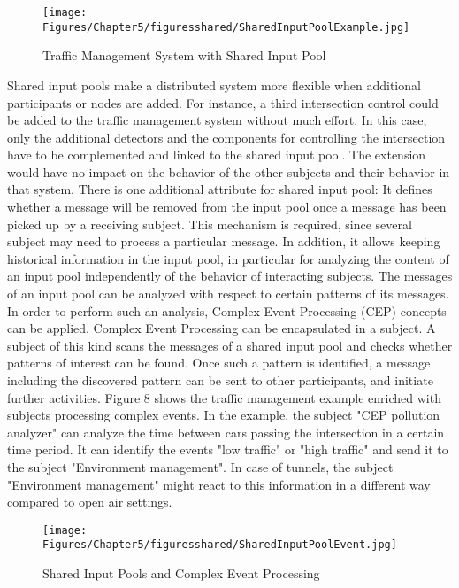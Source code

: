 \begin{figure}[htbp]
	\centering
	\texttt{[image: Figures/Chapter5/figuresshared/SharedInputPoolExample.jpg]}
	\caption[Traffic Management System with Shared Input Pool]{Traffic Management System with Shared Input Pool}
	\label{fig:SharedInputPooTraffic}
\end{figure}


Shared input pools make a distributed system more flexible when additional participants or nodes are added. For instance, a third intersection control could be added to the traffic management system without much effort. In this case, only the additional detectors and the components for controlling the intersection have to be complemented and linked to the shared input pool. The extension would have no impact on the behavior of the other subjects and their behavior in that system.
There is one additional attribute for shared input pool: It defines whether a message will be removed from the input pool once a message has been picked up by a receiving subject. This mechanism is required, since several subject may need to process a particular message. In addition, it allows keeping historical information in the input pool, in particular for analyzing the content of an input pool independently of the behavior of interacting subjects.
The messages of an input pool can be analyzed with respect to certain patterns of its messages. In order to perform such an analysis, Complex Event Processing (CEP) concepts can be applied. Complex Event Processing can be encapsulated in a subject. A subject of this kind scans the messages of a shared input pool and checks whether patterns of interest can be found. Once such a pattern is identified, a message including the discovered pattern can be sent to other participants, and initiate further activities. Figure 8 shows the traffic management example enriched with subjects processing complex events.
In the example, the subject "CEP pollution analyzer" can analyze the time between cars passing the intersection in a certain time period. It can identify the events "low traffic" or "high traffic" and send it to the subject "Environment management". In case of tunnels, the subject "Environment management" might react to this information in a different way compared to open air settings.


\begin{figure}[htbp]
	\centering
	\texttt{[image: Figures/Chapter5/figuresshared/SharedInputPoolEvent.jpg]}
	\caption[Shared Input Pools and Complex Event Processing]{Shared Input Pools and Complex Event Processing}
	\label{fig:sharedInputPoolEvents}
\end{figure}

